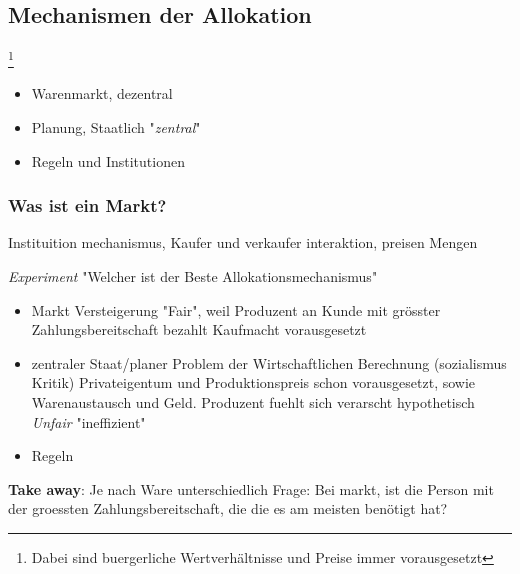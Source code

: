 \subsection{Mechanismen der Allokation}\footnote{Dabei sind buergerliche Wertverhältnisse und Preise immer vorausgesetzt}
\begin{itemize}
    \item Warenmarkt, dezentral
    \item Planung, Staatlich "\textit{zentral}"
    \item Regeln und Institutionen
\end{itemize}

\subsubsection{Was ist ein Markt?}
\begin{definition}
    [Markt] Instituition mechanismus, Kaufer und verkaufer interaktion, preisen Mengen
\end{definition}


\textit{Experiment}
"Welcher ist der Beste Allokationsmechanismus"
\begin{itemize}
    \item Markt 
        \subitem Versteigerung
        \subitem "Fair", weil Produzent an Kunde mit grösster Zahlungsbereitschaft bezahlt
        \subitem Kaufmacht vorausgesetzt
    \item zentraler Staat/planer
        \subitem Problem der Wirtschaftlichen Berechnung (sozialismus Kritik) 
        \subitem Privateigentum und Produktionspreis schon vorausgesetzt, sowie Warenaustausch und Geld. 
        \subitem Produzent fuehlt sich verarscht 
        \subitem hypothetisch \textit{Unfair}
        \subitem "ineffizient"
    \item Regeln 
\end{itemize}
\textbf{Take away}: Je nach Ware unterschiedlich
Frage: Bei markt, ist die Person mit der groessten Zahlungsbereitschaft, die die es am meisten benötigt hat?